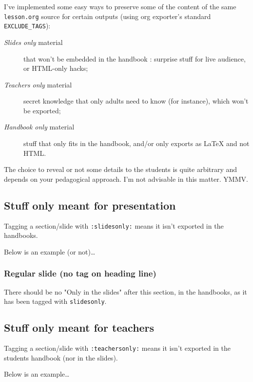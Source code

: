 \documentclass[a4paper]{article}
\begin{document}
I've implemented some easy ways to preserve some of the content of the same \texttt{lesson.org} source for certain outputs (using org exporter's standard \texttt{EXCLUDE\_TAGS}):

\begin{description}
\item[{\emph{Slides only} material}] that won't be embedded in the handbook : surprise stuff for live audience, or HTML-only hacks;
\item[{\emph{Teachers only} material}] secret knowledge that only adults need to know (for instance), which won't be exported;
\item[{\emph{Handbook only} material}] stuff that only fits in the handbook, and/or only exports as \LaTeX{} and not HTML.
\end{description}

\begin{NOTES}
The choice to reveal or not some details to the students is quite arbitrary and depends on your pedagogical approach. I'm not advisable in this matter. YMMV.
\end{NOTES}

\subsection{Stuff only meant for presentation}
\label{sec:orga627dfc}

Tagging a section/slide with \texttt{:slidesonly:} means it isn't exported in the handbooks.

Below is an example (or not)\ldots{}

\subsubsection{Regular slide (no tag on heading line)}
\label{sec:orga15f652}

There should be no "Only in the slides" after this section, in the
handbooks, as it has been tagged with \texttt{slidesonly}.

\subsection{Stuff only meant for teachers}
\label{sec:org8b36cea}

Tagging a section/slide with \texttt{:teachersonly:} means it isn't exported in the students handbook (nor in the slides).

Below is an example\ldots{}
\end{document}
